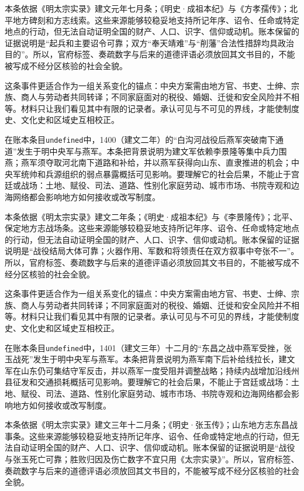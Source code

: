本条依据《明太宗实录》建文元年七月条；《明史·成祖本纪》与《方孝孺传》；北平地方碑刻和方志线索。这些来源能够较稳妥地支持所记年序、诏令、任命或特定地点的行动，但无法自动证明全国的财产、人口、识字、信仰或动机。账本保留的证据说明是“起兵和主要诏令可靠；双方“奉天靖难”与“削藩”合法性措辞均具政治目的”。所以，官府标签、奏疏数字与后来的道德评语必须放回其文书目的，不能被写成不经分区核验的社会全貌。

这条事件更适合作为一组关系变化的锚点：中央方案需由地方官、书吏、士绅、宗族、商人与劳动者共同转译；不同家庭面对的税役、婚姻、迁徙和安全风险并不相等。材料只让我们看见其中有限的记录者。承认可见与不可见的界线，才能使制度史、文化史和区域史互相校正。

在账本条目\texttt{undefined}中，1400（建文二年）的“白沟河战役后燕军突破南下通道”发生于明中央军与燕军。本条把背景说明为建文军依赖李景隆等集中兵力围燕；燕军须夺取河北南下道路和补给，并以燕军获得向山东、直隶推进的机会；中央军统帅和兵源组织的弱点暴露概括可见影响。要理解它的社会后果，不能止于宫廷或战场：土地、赋役、司法、道路、性别化家庭劳动、城市市场、书院寺观和边海网络都会影响地方如何接收或改写制度。

本条依据《明太宗实录》建文二年条；《明史·成祖本纪》与《李景隆传》；北平、保定地方志战场条。这些来源能够较稳妥地支持所记年序、诏令、任命或特定地点的行动，但无法自动证明全国的财产、人口、识字、信仰或动机。账本保留的证据说明是“战役结局大体可靠；火器作用、军数和将领责任在双方叙事中夸张不一”。所以，官府标签、奏疏数字与后来的道德评语必须放回其文书目的，不能被写成不经分区核验的社会全貌。

这条事件更适合作为一组关系变化的锚点：中央方案需由地方官、书吏、士绅、宗族、商人与劳动者共同转译；不同家庭面对的税役、婚姻、迁徙和安全风险并不相等。材料只让我们看见其中有限的记录者。承认可见与不可见的界线，才能使制度史、文化史和区域史互相校正。

在账本条目\texttt{undefined}中，1401（建文三年）十二月的“东昌之战中燕军受挫，张玉战死”发生于明中央军与燕军。本条把背景说明为燕军南下后补给线拉长，建文军在山东仍可集结守军反击，并以燕军一度受阻并调整战略；持续内战增加沿线州县征发和交通损耗概括可见影响。要理解它的社会后果，不能止于宫廷或战场：土地、赋役、司法、道路、性别化家庭劳动、城市市场、书院寺观和边海网络都会影响地方如何接收或改写制度。

本条依据《明太宗实录》建文三年十二月条；《明史·张玉传》；山东地方志东昌战事条。这些来源能够较稳妥地支持所记年序、诏令、任命或特定地点的行动，但无法自动证明全国的财产、人口、识字、信仰或动机。账本保留的证据说明是“战役与张玉死亡可靠；胜败归因及伤亡数字不宜只用《太宗实录》”。所以，官府标签、奏疏数字与后来的道德评语必须放回其文书目的，不能被写成不经分区核验的社会全貌。

